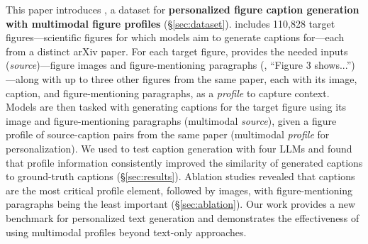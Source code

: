 This paper introduces \textbf{\dataset}, a dataset for \textbf{personalized figure caption generation with multimodal figure profiles} (\S\ref{sec:dataset}).
\dataset includes 110,828 target figures---scientific figures for which models aim to generate captions for---each from a distinct arXiv paper.
For each target figure, \dataset provides the needed inputs (\textit{source})---figure images and figure-mentioning paragraphs (\eg, ``Figure 3 shows...'')---along with up to three other figures from the same paper, each with its image, caption, and figure-mentioning paragraphs, as a \textit{profile} to capture context.
Models are then tasked with generating captions for the target figure using its image and figure-mentioning paragraphs (multimodal \textit{source}), given a figure profile of source-caption pairs from the same paper (multimodal \textit{profile} for personalization).
We used \dataset to test caption generation with four LLMs and found that profile information consistently improved the similarity of generated captions to ground-truth captions (\S\ref{sec:results}).
Ablation studies revealed that captions are the most critical profile element, followed by images, with figure-mentioning paragraphs being the least important (\S\ref{sec:ablation}).
Our work provides a new benchmark for personalized text generation and demonstrates the effectiveness of using multimodal profiles beyond text-only approaches.







